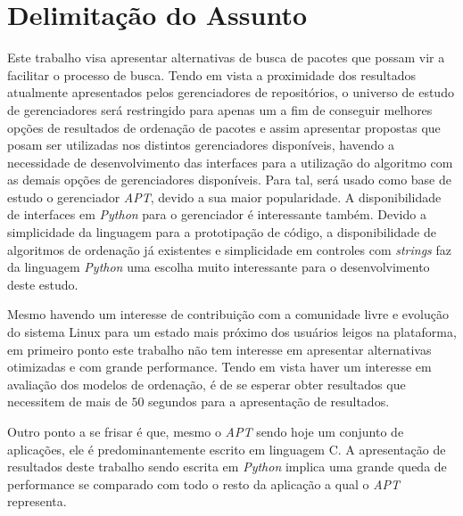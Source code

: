 \chapter{\nmu Delimitação do \nmu Assunto}
\label{cha:delimitacao}

Este trabalho visa apresentar alternativas de busca de pacotes que possam vir a facilitar  o processo de busca. Tendo em vista a proximidade dos resultados atualmente apresentados pelos gerenciadores de repositórios, o universo de estudo de gerenciadores será restringido para apenas um a fim de conseguir melhores opções de resultados de ordenação de pacotes e assim apresentar propostas que posam ser utilizadas nos distintos gerenciadores disponíveis, havendo a necessidade de desenvolvimento das interfaces para a utilização do algoritmo com as demais opções de gerenciadores disponíveis. Para tal, será usado como base de estudo o gerenciador \textit{APT}, devido a sua maior popularidade. A disponibilidade de  interfaces em \textit{Python} para o gerenciador é interessante também. Devido a simplicidade da linguagem para a prototipação de código, a disponibilidade de algoritmos de ordenação já existentes e simplicidade em controles com \textit{strings} faz da linguagem \textit{Python} uma escolha muito interessante para o desenvolvimento deste estudo.

Mesmo havendo um interesse de contribuição com a comunidade livre e evolução do sistema Linux para um estado mais próximo dos usuários leigos na plataforma, em primeiro ponto este trabalho não tem interesse em apresentar alternativas otimizadas e com grande performance. Tendo em vista haver um interesse em avaliação dos modelos de ordenação, é de se esperar obter resultados que necessitem de mais de $50$ segundos para a apresentação de resultados.

Outro ponto a se frisar é que, mesmo o \textit{APT} sendo hoje um conjunto de aplicações, ele é predominantemente escrito em linguagem C. A apresentação de resultados deste trabalho sendo escrita em \textit{Python} implica uma grande queda de performance se comparado com todo o resto da aplicação a qual o \textit{APT} representa.
